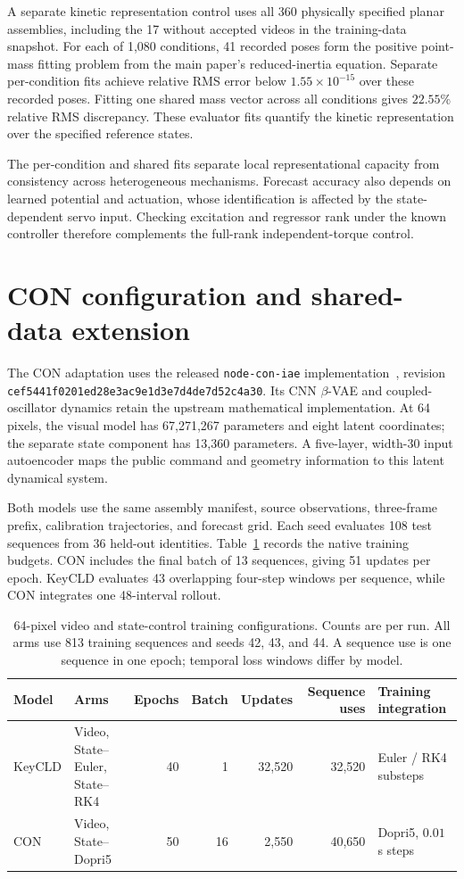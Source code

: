 A separate kinetic representation control uses all 360 physically specified planar assemblies, including the 17 without accepted videos in the training-data snapshot. For each of 1,080 conditions, 41 recorded poses form the positive point-mass fitting problem from the main paper's reduced-inertia equation. Separate per-condition fits achieve relative RMS error below $1.55\times10^{-15}$ over these recorded poses. Fitting one shared mass vector across all conditions gives $22.55\%$ relative RMS discrepancy. These evaluator fits quantify the kinetic representation over the specified reference states.

The per-condition and shared fits separate local representational capacity from consistency across heterogeneous mechanisms. Forecast accuracy also depends on learned potential and actuation, whose identification is affected by the state-dependent servo input. Checking excitation and regressor rank under the known controller therefore complements the full-rank independent-torque control.

\section{CON configuration and shared-data extension}
\label{app:con}
The CON adaptation uses the released \texttt{node-con-iae} implementation~\cite{stolzle2024con}, revision \texttt{cef5441f0201ed28e3ac9e1d3e7d4de7d52c4a30}. Its CNN $\beta$-VAE and coupled-oscillator dynamics retain the upstream mathematical implementation. At 64 pixels, the visual model has 67,271,267 parameters and eight latent coordinates; the separate state component has 13,360 parameters. A five-layer, width-30 input autoencoder maps the public command and geometry information to this latent dynamical system.

Both models use the same assembly manifest, source observations, three-frame prefix, calibration trajectories, and forecast grid. Each seed evaluates 108 test sequences from 36 held-out identities. Table~\ref{app:two-model-budget} records the native training budgets. CON includes the final batch of 13 sequences, giving 51 updates per epoch. KeyCLD evaluates 43 overlapping four-step windows per sequence, while CON integrates one 48-interval rollout.

\begin{table}[t]
\caption{64-pixel video and state-control training configurations. Counts are per run. All arms use 813 training sequences and seeds 42, 43, and 44. A sequence use is one sequence in one epoch; temporal loss windows differ by model.}
\label{app:two-model-budget}
\centering\small
\begin{tabular}{llrrrrl}
\toprule
Model & Arms & Epochs & Batch & Updates & Sequence uses & Training integration\\
\midrule
KeyCLD & Video, State--Euler, State--RK4 & 40 & 1 & 32,520 & 32,520 & Euler / RK4 substeps\\
CON & Video, State--Dopri5 & 50 & 16 & 2,550 & 40,650 & Dopri5, $0.01$ s steps\\
\bottomrule
\end{tabular}
\end{table}

